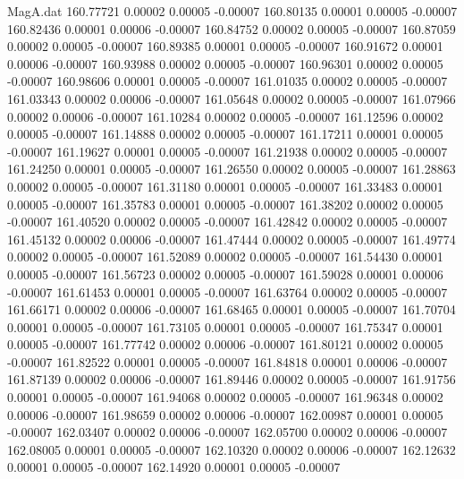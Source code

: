 \begin{filecontents}{MagA.dat}
 160.77721    0.00002    0.00005   -0.00007
 160.80135    0.00001    0.00005   -0.00007
 160.82436    0.00001    0.00006   -0.00007
 160.84752    0.00002    0.00005   -0.00007
 160.87059    0.00002    0.00005   -0.00007
 160.89385    0.00001    0.00005   -0.00007
 160.91672    0.00001    0.00006   -0.00007
 160.93988    0.00002    0.00005   -0.00007
 160.96301    0.00002    0.00005   -0.00007
 160.98606    0.00001    0.00005   -0.00007
 161.01035    0.00002    0.00005   -0.00007
 161.03343    0.00002    0.00006   -0.00007
 161.05648    0.00002    0.00005   -0.00007
 161.07966    0.00002    0.00006   -0.00007
 161.10284    0.00002    0.00005   -0.00007
 161.12596    0.00002    0.00005   -0.00007
 161.14888    0.00002    0.00005   -0.00007
 161.17211    0.00001    0.00005   -0.00007
 161.19627    0.00001    0.00005   -0.00007
 161.21938    0.00002    0.00005   -0.00007
 161.24250    0.00001    0.00005   -0.00007
 161.26550    0.00002    0.00005   -0.00007
 161.28863    0.00002    0.00005   -0.00007
 161.31180    0.00001    0.00005   -0.00007
 161.33483    0.00001    0.00005   -0.00007
 161.35783    0.00001    0.00005   -0.00007
 161.38202    0.00002    0.00005   -0.00007
 161.40520    0.00002    0.00005   -0.00007
 161.42842    0.00002    0.00005   -0.00007
 161.45132    0.00002    0.00006   -0.00007
 161.47444    0.00002    0.00005   -0.00007
 161.49774    0.00002    0.00005   -0.00007
 161.52089    0.00002    0.00005   -0.00007
 161.54430    0.00001    0.00005   -0.00007
 161.56723    0.00002    0.00005   -0.00007
 161.59028    0.00001    0.00006   -0.00007
 161.61453    0.00001    0.00005   -0.00007
 161.63764    0.00002    0.00005   -0.00007
 161.66171    0.00002    0.00006   -0.00007
 161.68465    0.00001    0.00005   -0.00007
 161.70704    0.00001    0.00005   -0.00007
 161.73105    0.00001    0.00005   -0.00007
 161.75347    0.00001    0.00005   -0.00007
 161.77742    0.00002    0.00006   -0.00007
 161.80121    0.00002    0.00005   -0.00007
 161.82522    0.00001    0.00005   -0.00007
 161.84818    0.00001    0.00006   -0.00007
 161.87139    0.00002    0.00006   -0.00007
 161.89446    0.00002    0.00005   -0.00007
 161.91756    0.00001    0.00005   -0.00007
 161.94068    0.00002    0.00005   -0.00007
 161.96348    0.00002    0.00006   -0.00007
 161.98659    0.00002    0.00006   -0.00007
 162.00987    0.00001    0.00005   -0.00007
 162.03407    0.00002    0.00006   -0.00007
 162.05700    0.00002    0.00006   -0.00007
 162.08005    0.00001    0.00005   -0.00007
 162.10320    0.00002    0.00006   -0.00007
 162.12632    0.00001    0.00005   -0.00007
 162.14920    0.00001    0.00005   -0.00007

\end{filecontents}
